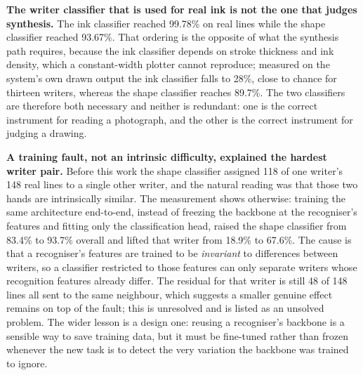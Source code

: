         \textbf{The writer classifier that is used for real ink is not the one that judges synthesis.}
        The ink classifier reached 99.78\% on real lines while the shape classifier reached 93.67\%.
        That ordering is the opposite of what the synthesis path requires, because the ink classifier depends on stroke thickness and ink density, which a constant-width plotter cannot reproduce; measured on the system's own drawn output the ink classifier falls to 28\%, close to chance for thirteen writers, whereas the shape classifier reaches 89.7\%.
        The two classifiers are therefore both necessary and neither is redundant: one is the correct instrument for reading a photograph, and the other is the correct instrument for judging a drawing.

        \textbf{A training fault, not an intrinsic difficulty, explained the hardest writer pair.}
        Before this work the shape classifier assigned 118 of one writer's 148 real lines to a single other writer, and the natural reading was that those two hands are intrinsically similar.
        The measurement shows otherwise: training the same architecture end-to-end, instead of freezing the backbone at the recogniser's features and fitting only the classification head, raised the shape classifier from 83.4\% to 93.7\% overall and lifted that writer from 18.9\% to 67.6\%.
        The cause is that a recogniser's features are trained to be \emph{invariant} to differences between writers, so a classifier restricted to those features can only separate writers whose recognition features already differ.
        The residual for that writer is still 48 of 148 lines all sent to the same neighbour, which suggests a smaller genuine effect remains on top of the fault; this is unresolved and is listed as an unsolved problem.
        The wider lesson is a design one: reusing a recogniser's backbone is a sensible way to save training data, but it must be fine-tuned rather than frozen whenever the new task is to detect the very variation the backbone was trained to ignore.

